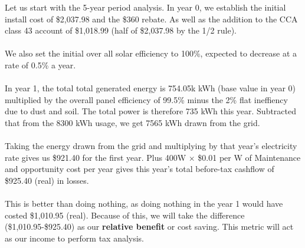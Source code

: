 \documentclass[10pt,letterpaper]{article}
\begin{document}
Let us start with the 5-year period analysis. In year 0, we establish the initial install cost of \$2,037.98 and the \$360 rebate. As well as the addition to the CCA class 43 account of \$1,018.99 (half of \$2,037.98 by the 1/2 rule).\\
\\
We also set the initial over all solar efficiency to 100\%, expected to decrease at a rate of 0.5\% a year.\\
\\
In year 1, the total total generated energy is 754.05k kWh (base value in year 0) multiplied by the overall panel efficiency of 99.5\% minus the 2\% flat ineffiency due to dust and soil. The total power is therefore 735 kWh this year. Subtracted that from the 8300 kWh usage, we get 7565 kWh drawn from the grid.\\
\\
Taking the energy drawn from the grid and multiplying by that year's electricity rate gives us \$921.40 for the first year. Plus 400W $\times$ \$0.01 per W of Maintenance and opportunity cost per year gives this year's total before-tax cashflow of \$925.40 (real) in losses.\\
\\
This is better than doing nothing, as doing nothing in the year 1 would have costed \$1,010.95 (real). Because of this, we will take the difference (\$1,010.95-\$925.40) as our \textbf{relative benefit} or cost saving. This metric will act as our income to perform tax analysis.\\
\\ 
\end{document}
